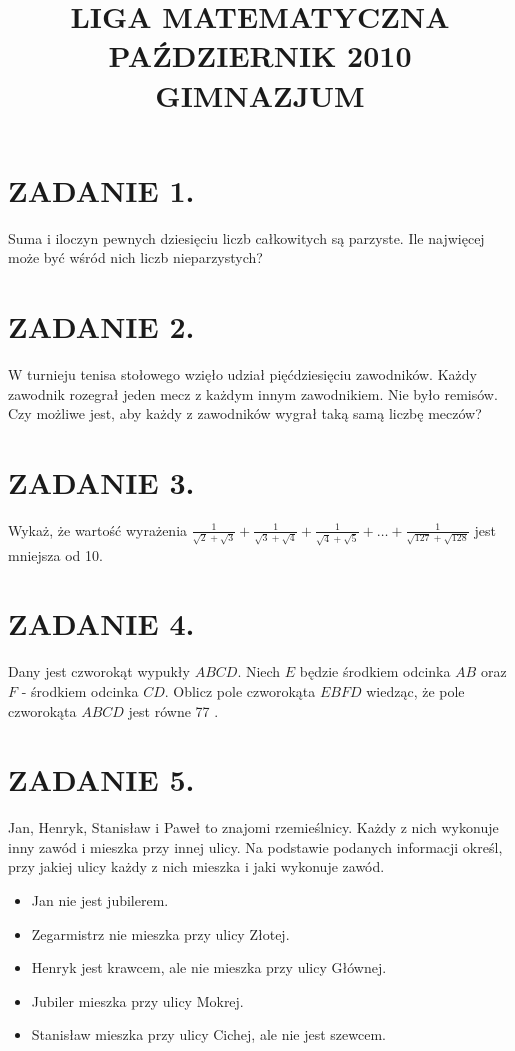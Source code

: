 \documentclass[10pt]{article}
\title{LIGA MATEMATYCZNA \\
 PAŹDZIERNIK 2010 \\
 GIMNAZJUM }
\author{}
\date{}
\begin{document}
\maketitle
\section*{ZADANIE 1.}
Suma i iloczyn pewnych dziesięciu liczb całkowitych są parzyste. Ile najwięcej może być wśród nich liczb nieparzystych?

\section*{ZADANIE 2.}
W turnieju tenisa stołowego wzięło udział pięćdziesięciu zawodników. Każdy zawodnik rozegrał jeden mecz z każdym innym zawodnikiem. Nie było remisów. Czy możliwe jest, aby każdy z zawodników wygrał taką samą liczbę meczów?

\section*{ZADANIE 3.}
Wykaż, że wartość wyrażenia \(\frac{1}{\sqrt{2}+\sqrt{3}}+\frac{1}{\sqrt{3}+\sqrt{4}}+\frac{1}{\sqrt{4}+\sqrt{5}}+\ldots+\frac{1}{\sqrt{127}+\sqrt{128}}\) jest mniejsza od 10.

\section*{ZADANIE 4.}
Dany jest czworokąt wypukły \(A B C D\). Niech \(E\) będzie środkiem odcinka \(A B\) oraz \(F\) - środkiem odcinka \(C D\). Oblicz pole czworokąta \(E B F D\) wiedząc, że pole czworokąta \(A B C D\) jest równe 77 .

\section*{ZADANIE 5.}
Jan, Henryk, Stanisław i Paweł to znajomi rzemieślnicy. Każdy z nich wykonuje inny zawód i mieszka przy innej ulicy. Na podstawie podanych informacji określ, przy jakiej ulicy każdy z nich mieszka i jaki wykonuje zawód.

\begin{itemize}
  \item Jan nie jest jubilerem.
  \item Zegarmistrz nie mieszka przy ulicy Złotej.
  \item Henryk jest krawcem, ale nie mieszka przy ulicy Głównej.
  \item Jubiler mieszka przy ulicy Mokrej.
  \item Stanisław mieszka przy ulicy Cichej, ale nie jest szewcem.
\end{itemize}
\end{document}
